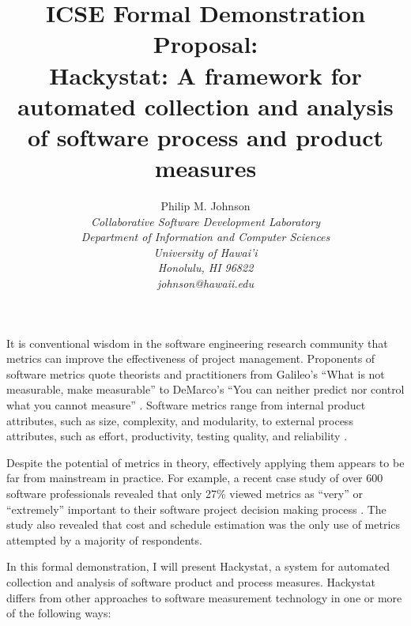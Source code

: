 \documentclass[11pt,twocolumn]{article}
\begin{document}
\title{ICSE Formal Demonstration Proposal: \\
      Hackystat: A framework for automated collection and analysis \\ 
      of software process and product measures}


\author{Philip M. Johnson \\
\em  Collaborative Software Development Laboratory \\
\em  Department of Information and Computer Sciences \\
\em  University of Hawai'i \\
\em  Honolulu, HI 96822 \\
\em  johnson@hawaii.edu}
\maketitle
\thispagestyle{empty}

\label{sec:intro}

It is conventional wisdom in the software engineering research community
that metrics can improve the effectiveness of project management.
Proponents of software metrics quote theorists and practitioners from
Galileo's ``What is not measurable, make measurable'' \cite{Finkelstein82}
to DeMarco's ``You can neither predict nor control what you cannot
measure'' \cite{DeMarco82}.  Software metrics range from internal product
attributes, such as size, complexity, and modularity, to external process
attributes, such as effort, productivity, testing quality, and reliability
\cite{Fenton97}.

Despite the potential of metrics in theory, effectively applying them
appears to be far from mainstream in practice. For example, a recent case
study of over 600 software professionals revealed that only 27\% viewed
metrics as ``very'' or ``extremely'' important to their software project
decision making process \cite{Kulik2003}. The study also revealed that cost
and schedule estimation was the only use of metrics attempted by a majority
of respondents.

In this formal demonstration, I will present Hackystat, a system for
automated collection and analysis of software product and process measures.
Hackystat differs from other approaches to software measurement technology
in one or more of the following ways:
\end{document}
